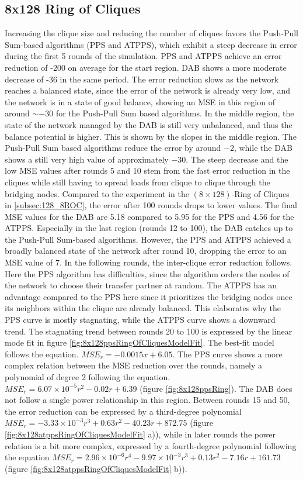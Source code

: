 \subsection{8x128 Ring of Cliques}\label{subsec:8_128ROC}
Increasing the clique size and reducing the number of cliques favors the Push-Pull Sum-based algorithms (PPS and ATPPS), which exhibit a steep decrease in error during the first 5 rounds of the simulation. PPS and ATPPS achieve an error reduction of -200 on average for the start region. DAB shows a more moderate decrease of -36 in the same period. The error reduction slows as the network reaches a balanced state, since the error of the network is already very low, and the network is in a state of good balance, showing an MSE in this region of around $\sim -30$ for the Push-Pull Sum based algorithms. In the middle region, the state of the network managed by the DAB is still very unbalanced, and thus the balance potential is higher. This is shown by the slopes in the middle region. The Push-Pull Sum based algorithms reduce the error by around $-2$, while the DAB shows a still very high value of approximately $-30$. The steep decrease and the low MSE values after rounds 5 and 10 stem from the fast error reduction in the cliques while still having to spread loads from clique to clique through the bridging nodes. Compared to the experiment in the $(8 \times 128)$-Ring of Cliques in \ref{subsec:128_8ROC}, the error after 100 rounds drops to lower values. The final MSE values for the DAB are 5.18 compared to 5.95 for the PPS and 4.56 for the ATPPS. Especially in the last region (rounds 12 to 100), the DAB catches up to the Push-Pull Sum-based algorithms. However, the PPS and ATPPS achieved a broadly balanced state of the network after round 10, dropping the error to an MSE value of 7. In the following rounds, the inter-clique error reduction follows. Here the PPS algorithm has difficulties, since the algorithm orders the nodes of the network to choose their transfer partner at random. The ATPPS has an advantage compared to the PPS here since it prioritizes the bridging nodes once its neighbors within the clique are already balanced. This elaborates why the PPS curve is mostly stagnating, while the ATPPS curve shows a downward trend. The stagnating trend between rounds 20 to 100 is expressed by the linear mode fit in figure \ref{fig:8x128ppsRingOfCliquesModelFit}. The best-fit model follows the equation. $MSE_r=-0.0015x+6.05$. The PPS curve shows a more complex relation between the MSE reduction over the rounds, namely a polynomial of degree 2 following the equation. $MSE_r=6.07\times 10^{-5}r^{2}-0.02r+6.39$ (figure \ref{fig:8x128ppsRing}). The DAB does not follow a single power relationship in this region. Between rounds 15 and 50, the error reduction can be expressed by a third-degree polynomial $MSE_r=-3.33\times 10^{-3}r^{3}+0.63r^{2}-40.23r+872.75$ (figure \ref{fig:8x128atppsRingOfCliquesModelFit} a)), while in later rounds the power relation is a bit more complex, expressed by a fourth-degree polynomial following the equation $MSE_r=2.96 \times 10^{-6}r^{4}-9.97\times 10^{-3}r^{3}+0.13r^{2}-7.16r+161.73$ (figure \ref{fig:8x128atppsRingOfCliquesModelFit} b)).

